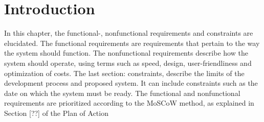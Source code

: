 \chapter{Introduction}
\thispagestyle{fancy}
In this chapter, the functional-, nonfunctional requirements and constraints are elucidated. The functional requirements are requirements that pertain to the way the system should function. The nonfunctional requirements describe how the system should operate, using terms such as speed, design, user-friendliness and optimization of costs. The last section: constraints, describe the limits of the development process and proposed system. It can include constraints such as the date on which the system must be ready. The functional and nonfunctional requirements are prioritized according to the MoSCoW method, as explained in Section [??] of the Plan of Action